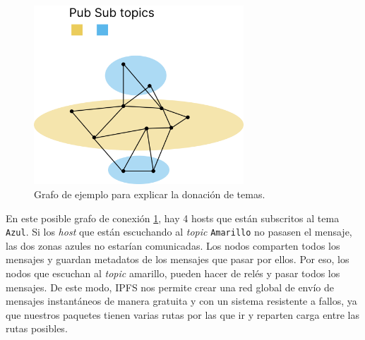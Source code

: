 \begin{figure}[H]
    \centering
    \includegraphics[width=0.7\textwidth]{Figures/Zonas multiples.png}
    \caption{Grafo de ejemplo para explicar la donación de temas.}
    \label{fg:zonas_multiples}
\end{figure}
En este posible grafo de conexión \ref{fg:zonas_multiples}, hay 4 hosts que están subscritos al tema \verb|Azul|. Si los \textit{host} que están escuchando al \textit{topic} \verb|Amarillo| no pasasen el mensaje, las dos zonas azules no estarían comunicadas.
Los nodos comparten todos los mensajes y guardan metadatos de los mensajes que pasar por ellos. Por eso, los nodos que escuchan al \textit{topic} amarillo, pueden hacer de relés y pasar todos los mensajes.
De este modo, IPFS nos permite crear una red global de envío de mensajes instantáneos de manera gratuita y con un sistema resistente a fallos, ya que nuestros paquetes tienen varias rutas por las que ir y reparten carga entre las rutas posibles.
